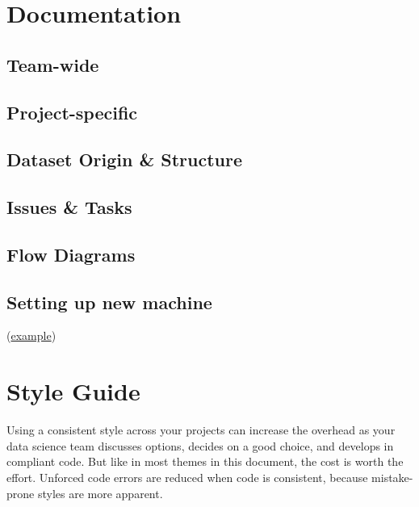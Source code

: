 \documentclass[]{book}
\begin{document}
\hypertarget{document}{%
\chapter{Documentation}\label{document}}

\hypertarget{team-wide}{%
\section{Team-wide}\label{team-wide}}

\hypertarget{project-specific}{%
\section{Project-specific}\label{project-specific}}

\hypertarget{dataset-origin-structure}{%
\section{Dataset Origin \& Structure}\label{dataset-origin-structure}}

\hypertarget{issues-tasks}{%
\section{Issues \& Tasks}\label{issues-tasks}}

\hypertarget{flow-diagrams}{%
\section{Flow Diagrams}\label{flow-diagrams}}

\hypertarget{setting-up-new-machine}{%
\section{Setting up new machine}\label{setting-up-new-machine}}

(\href{https://github.com/OuhscBbmc/RedcapExamplesAndPatterns/blob/master/DocumentationGlobal/ResourcesInstallation.md}{example})

\hypertarget{style-guide}{%
\chapter{Style Guide}\label{style-guide}}

Using a consistent style across your projects can increase the overhead as your data science team discusses options, decides on a good choice, and develops in compliant code. But like in most themes in this document, the cost is worth the effort. Unforced code errors are reduced when code is consistent, because mistake-prone styles are more apparent.
\end{document}
